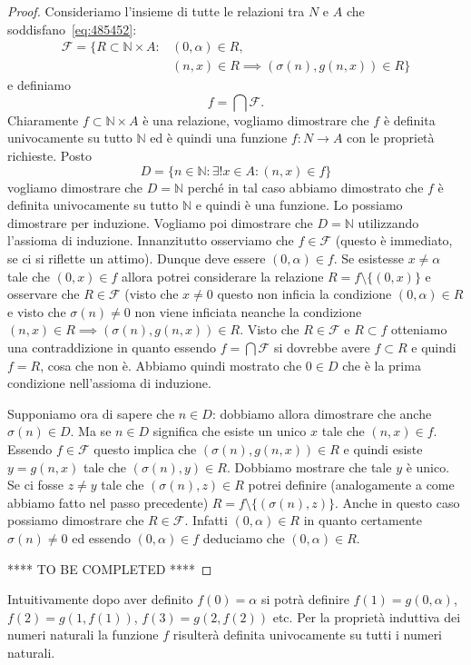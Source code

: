 \documentclass[italian,a4paper,hidelinks,headinclude]{scrartcl}
\newcommand{\NN}{{\mathbb N}}
\begin{document}
\begin{proof}
Consideriamo l'insieme di tutte le relazioni tra $N$ e $A$
che soddisfano~\eqref{eq:485452}:
\begin{align*}
\mathcal F = \{ R\subset \NN \times A \colon &(0,\alpha)\in R,\\
  &(n,x)\in R \implies (\sigma(n),g(n,x))\in R \}
\end{align*}
e definiamo
\[
  f = \bigcap \mathcal F.
\]
Chiaramente $f\subset \NN\times A$ è una relazione,
vogliamo dimostrare che $f$ è definita univocamente su tutto $\NN$
ed è quindi una funzione $f\colon N \to A$ con le proprietà richieste.
Posto
\[
  D = \{ n\in \NN\colon \exists! x\in A\colon (n,x)\in f \}
\]
vogliamo dimostrare che $D=\NN$ perché in tal caso abbiamo dimostrato che $f$ è
definita univocamente su tutto $\NN$ e quindi è una funzione.
Lo possiamo dimostrare per induzione.
Vogliamo poi dimostrare che $D=\NN$ utilizzando l'assioma di induzione.
Innanzitutto osserviamo che $f\in \mathcal F$ (questo è immediato,
se ci si riflette un attimo).
Dunque deve essere $(0,\alpha)\in f$.
Se esistesse $x\neq \alpha$ tale che $(0,x)\in f$ allora potrei considerare la
relazione $R= f \setminus \{(0,x)\}$ e osservare che $R\in \mathcal F$
(visto che $x\neq 0$ questo non inficia la condizione $(0,\alpha)\in R$ e
visto che $\sigma(n)\neq 0$ non viene inficiata neanche la condizione
$(n,x)\in R \implies (\sigma(n),g(n,x))\in R$. Visto che $R\in \mathcal F$
e $R\subset f$ otteniamo una contraddizione in quanto essendo $f=\bigcap \mathcal F$
si dovrebbe avere $f\subset R$ e quindi $f=R$, cosa che non è.
Abbiamo quindi mostrato che $0\in D$ che è la prima condizione nell'assioma di induzione.

Supponiamo ora di sapere che $n\in D$: dobbiamo allora dimostrare che anche
$\sigma(n)\in D$. Ma se $n\in D$ significa che esiste un unico $x$ tale che
$(n,x)\in f$. Essendo $f\in \mathcal F$ questo implica che $(\sigma(n),g(n,x))\in R$
e quindi esiste $y=g(n,x)$ tale che $(\sigma(n),y)\in R$. Dobbiamo mostrare
che tale $y$ è unico. Se ci fosse $z\neq y$ tale che $(\sigma(n),z)\in R$ potrei
definire (analogamente a come abbiamo fatto nel passo precedente)
$R=f\setminus\{(\sigma(n),z)\}$. Anche in questo caso possiamo dimostrare
che $R\in \mathcal F$. Infatti $(0,\alpha)\in R$ in quanto certamente $\sigma(n)\neq 0$
ed essendo $(0,\alpha)\in f$ deduciamo che $(0,\alpha)\in R$.

**** TO BE COMPLETED ****
\end{proof}

Intuitivamente dopo aver definito $f(0) = \alpha$ si potrà definire
$f(1) = g(0, \alpha)$, $f(2) = g(1, f(1))$, $f(3) = g(2, f(2))$ etc.
Per la proprietà induttiva dei numeri naturali la funzione $f$ risulterà
definita univocamente su tutti i numeri naturali.
\end{document}
